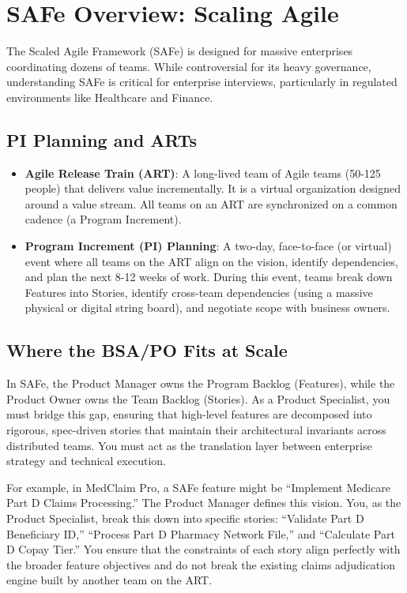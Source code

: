 \section{SAFe Overview: Scaling
Agile}\label{safe-overview-scaling-agile}

The Scaled Agile Framework (SAFe) is designed for massive enterprises
coordinating dozens of teams. While controversial for its heavy
governance, understanding SAFe is critical for enterprise interviews,
particularly in regulated environments like Healthcare and Finance.

\subsection{PI Planning and ARTs}\label{pi-planning-and-arts}

\begin{itemize}
\tightlist
\item
  \textbf{Agile Release Train (ART)}: A long-lived team of Agile teams
  (50-125 people) that delivers value incrementally. It is a virtual
  organization designed around a value stream. All teams on an ART are
  synchronized on a common cadence (a Program Increment).
\item
  \textbf{Program Increment (PI) Planning}: A two-day, face-to-face (or
  virtual) event where all teams on the ART align on the vision,
  identify dependencies, and plan the next 8-12 weeks of work. During
  this event, teams break down Features into Stories, identify
  cross-team dependencies (using a massive physical or digital string
  board), and negotiate scope with business owners.
\end{itemize}

\subsection{Where the BSA/PO Fits at
Scale}\label{where-the-bsapo-fits-at-scale}

In SAFe, the Product Manager owns the Program Backlog (Features), while
the Product Owner owns the Team Backlog (Stories). As a Product
Specialist, you must bridge this gap, ensuring that high-level features
are decomposed into rigorous, spec-driven stories that maintain their
architectural invariants across distributed teams. You must act as the
translation layer between enterprise strategy and technical execution.

For example, in MedClaim Pro, a SAFe feature might be ``Implement
Medicare Part D Claims Processing.'' The Product Manager defines this
vision. You, as the Product Specialist, break this down into specific
stories: ``Validate Part D Beneficiary ID,'' ``Process Part D Pharmacy
Network File,'' and ``Calculate Part D Copay Tier.'' You ensure that the
constraints of each story align perfectly with the broader feature
objectives and do not break the existing claims adjudication engine
built by another team on the ART.

